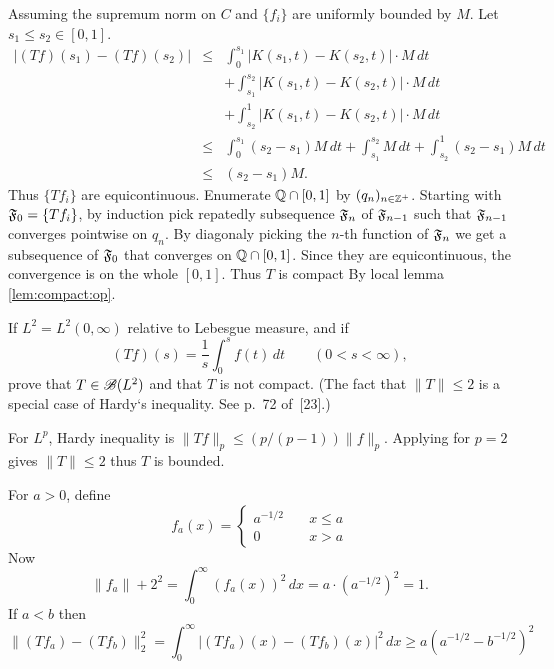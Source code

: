 \begin{enumerate}
\begin{itemize}
Assuming the supremum norm on $C$
and \(\{f_i\}\) are uniformly bounded by $M$.
Let \(s_1 \leq s_2 \in [0,1]\).
\begin{eqnarray*}
\left|(Tf)(s_1) - (Tf)(s_2)\right|
 &\leq& \int_0^{s_1}\left|K(s_1,t) - K(s_2,t)\right|\cdot M\,dt \\
 &    & + \int_{s_1}^{s_2} \left|K(s_1,t) - K(s_2,t)\right|\cdot M\,dt \\
 &    & + \int_{s_2}^1 \left|K(s_1,t) - K(s_2,t)\right|\cdot M\,dt \\
 &\leq& \int_0^{s_1}(s_2 - s_1) M\,dt
         + \int_{s_1}^{s_2}  M\,dt 
         + \int_{s_2}^1 (s_2 - s_1) M\,dt \\
 &\leq& (s_2 - s_1) M.
\end{eqnarray*}
Thus \(\{Tf_i\}\) are equicontinuous.
Enumerate \(\mathbb{Q}\cap[0,1]\) by \((q_n)_{n\in\mathbb{Z}^+}\).
Starting with  \(\mathfrak{F}_0=\{Tf_i\}\),
by induction pick repatedly subsequence \(\mathfrak{F}_n\)
of \(\mathfrak{F}_{n-1}\) such that  \(\mathfrak{F}_{n-1}\) converges
pointwise on \(q_n\).
By diagonaly picking the $n$-th function of \(\mathfrak{F}_n\)
we get a subsequence of \(\mathfrak{F}_0\) that converges
on \(\mathbb{Q}\cap[0,1]\). Since they are equicontinuous, the convergence
is on the whole \([0,1]\).
Thus $T$ is compact By local lemma \ref{lem:compact:op}.
\end{itemize}

\begin{excopy}
If \(L^2 = L^2(0,\infty)\) relative to Lebesgue measure, and if
\begin{equation*}
(Tf)(s) = \frac{1}{s} \int_0^s f(t)\,dt \qquad (0 < s < \infty),
\end{equation*}
prove that \(T \in \mathscr{B}(L^2)\) and that $T$ is not compact.
 (The fact that \(\|T\| \leq 2\) is a special case
of  Hardy`s inequality. See p.~72 of~[23].)
\end{excopy}

For \(L^p\), Hardy inequality is \(\|Tf\|_p \leq (p/(p-1))\|f\|_p\).
Applying for \(p=2\) gives \(\|T\| \leq 2\) thus $T$ is bounded.

For \(a > 0\), define
\begin{equation*}
f_a(x) = \left\{
  \begin{array}{ll}
  a^{-1/2} \quad & x \leq a \\
  0        & x > a
  \end{array}
  \right.
\end{equation*}
Now
\begin{equation*}
\|f_a\|+2^2 = \int_0^\infty (f_a(x))^2\,dx 
  = a\cdot \left(a^{-1/2}\right)^2 = 1.
\end{equation*}
If \(a < b\) then
\begin{equation*}
\|(T f_a) - (T f_b)\|_2^2
  = \int_0^\infty \left|(T f_a)(x) - (T f_b)(x)\right|^2\,dx
  \geq a \left(a^{-1/2} - b^{-1/2}\right)^2 
\end{equation*}


\end{enumerate}
